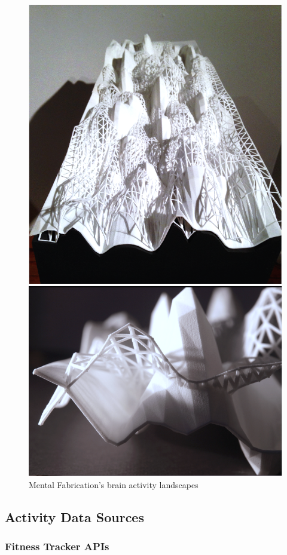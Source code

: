 \documentclass[../medieninformatik-arbeit.tex]{subfiles}
\begin{document}
\begin{figure}[h]
\centering
\begin{minipage}{.45\textwidth}
\centering
\includegraphics[width=\linewidth,trim= 0mm 37.5mm 0mm 37.5mm, clip=true]{RelatedWork/img/mentalfab1-as}
\end{minipage}
\begin{minipage}{.45\textwidth}
\centering
  \includegraphics[width=\linewidth]{RelatedWork/img/mentalfab-as}
\end{minipage}
\caption{\protect Mental Fabrication's brain activity landscapes\cite{mental2014fabrications}}
\label{fig:mentalfab}
\end{figure}

\subsection{Activity Data Sources}


\subsubsection{Fitness Tracker APIs}
\end{document}
